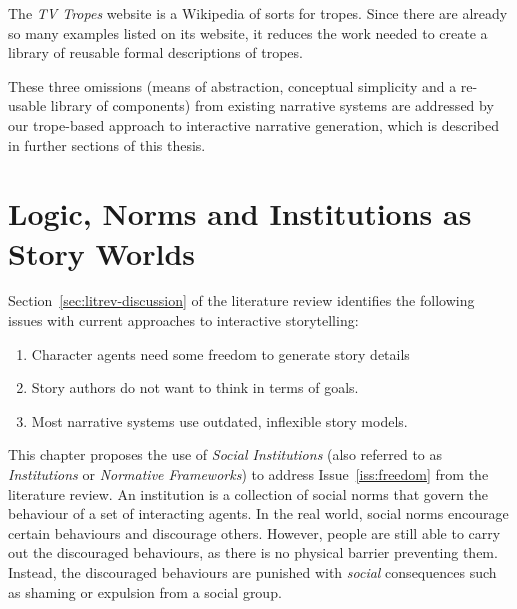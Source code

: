 \documentclass[11pt]{report}
\begin{document}
The \emph{TV Tropes} website is a Wikipedia of sorts for tropes. Since there are
already so many examples listed on its website, it reduces the work needed to
create a library of reusable formal descriptions of tropes.

These three omissions (means of abstraction, conceptual simplicity and a
re-usable library of components) from existing narrative systems are addressed
by our trope-based approach to interactive narrative generation, which is
described in further sections of this thesis.



\chapter{Logic, Norms and Institutions as Story Worlds}
\label{cha:institutions}


Section~\ref{sec:litrev-discussion} of the literature review identifies the following issues with current approaches to interactive storytelling:

\begin{enumerate}[{Issue} 1:]
\item Character agents need some freedom to generate story details
\item Story authors do not want to think in terms of goals.
\item Most narrative systems use outdated, inflexible story models.
\end{enumerate}

This chapter proposes the use of \emph{Social Institutions} (also referred to as
\emph{Institutions} or \emph{Normative Frameworks}) to address
Issue~\ref{iss:freedom} from the literature review. An institution is a
collection of social norms that govern the behaviour of a set of interacting
agents. In the real world, social norms encourage certain behaviours and
discourage others. However, people are still able to carry out the discouraged
behaviours, as there is no physical barrier preventing them. Instead, the
discouraged behaviours are punished with \emph{social} consequences such as
shaming or expulsion from a social group.
\end{document}
